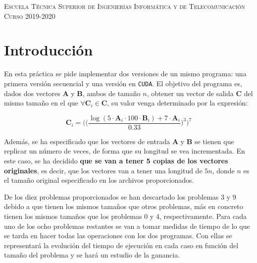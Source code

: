 \documentclass[11pt,a4paper]{article}
\renewcommand{\vec}[1]{\mathbf{#1}}
\begin{document}
\begin{titlepage}
\begin{minipage}{\textwidth}
\vspace{0.7cm}
\textsc{Escuela Técnica Superior de Ingenierías Informática y de Telecomunicación}\\
\vspace{1cm}
\textsc{Curso 2019-2020}
\end{minipage}
\end{titlepage}

\tableofcontents
\thispagestyle{empty}				%

\newpage

\setlength{\parskip}{1em}

\section{Introducción}

En esta práctica se pide implementar dos versiones de un mismo programa: una primera
versión secuencial y una versión en \texttt{CUDA}. El objetivo del programa es, dados
dos vectores $\vec{A}$ y $\vec{B}$, ambos de tamaño $n$, obtener un vector de salida
$\vec{C}$ del mismo tamaño en el que $\forall \vec{C}_i \in \vec{C}$, su valor
venga determinado por la expresión:

\begin{equation}
\vec{C}_i =
\Bigg(
\bigg(
\frac{\log(5 \cdot \vec{A}_i \cdot 100 \cdot \vec{B}_i) + 7 \cdot \vec{A}_i}{0.33}
\bigg)^3 \Bigg)^7
\label{eq:formula}
\end{equation}

Además, se ha especificado que los vectores de entrada $\vec{A}$ y $\vec{B}$
se tienen que replicar un número de veces, de forma que su longitud se vea incrementada.
En este caso, se ha decidido \textbf{que se van a tener 5 copias de los vectores originales},
es decir, que los vectores van a tener una longitud de $5n$, donde $n$ es el tamaño
original especificado en los archivos proporcionados.

De los diez problemas proporcionados se han descartado los problemas 3 y 9 debido a que
tienen los mismos tamaños que otros problemas, más en concreto tienen los mismos tamaños que los
problemas 0 y 4, respectivamente. Para cada uno de los ocho problemas restantes se van a tomar
medidas de tiempo de lo que se tarda en hacer todas las operaciones con los dos programas.
Con ellas se representará la evolución del tiempo de ejecución en cada caso en función
del tamaño del problema y se hará un estudio de la ganancia.
\end{document}
